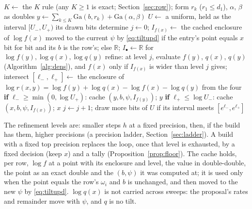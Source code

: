 \documentclass[11pt]{article}
\theoremstyle{definition}
\newcommand{\Ga}{\mathrm{Ga}}
\newcommand{\R}{\mathbb{R}}
\begin{document}
\begin{algorithm}[H]
\caption{\textsc{RowStep}$(x,b,\psi)$: one IMH step with a certified decision}\label{alg:row}
\begin{algorithmic}[1]
\State $K\gets$ the $K$ rule (any $K\ge1$ is exact; Section~\ref{sec:row}); form $r_k$ ($r_1\le d_1$), $\alpha$,
$\beta$ as doubles
\State $y\gets\sum_{k\le K}\Ga(b,r_k)+\Ga(\alpha,\beta)$ 
\State $U\gets$ a uniform, held as the interval $[U_-,U_+)$ its drawn bits determine
\State $j\gets0$; $I_{f(x)}\gets$ the cached enclosure of $\log f(x)$ moved to the current $\psi$ by
\eqref{eq:tiltupd} if the entry's point equals $x$ bit for bit and its $b$ is the row's; else $\R$; $I_\bullet\gets\R$ for $\log f(y),\log q(x),\log q(y)$
\Loop
  \State refine: at level $j$, evaluate $f(y)$, $q(x)$, $q(y)$ (Algorithm~\ref{alg:dens}), and $f(x)$ only if
  $I_{f(x)}$ is wider than level $j$ gives; intersect
  \State $[\ell_-,\ell_+]\gets$ the enclosure of $\log r(x,y)=\log f(y)+\log q(x)-\log f(x)-\log q(y)$ from the four
  \State \textbf{if} $\ell_-\ge\min(0,\log U_+)$: cache $(y,b,\psi,I_{f(y)})$; \Return $y$ 
  \State \textbf{if} $\ell_+\le\log U_-$: cache $(x,b,\psi,I_{f(x)})$; \Return $x$ 
  \State $j\gets j+1$; draw more bits of $U$ if its interval meets $[e^{\ell_-},e^{\ell_+}]$
\EndLoop
\end{algorithmic}
\end{algorithm}

The refinement levels are: smaller steps $h$ at a fixed precision, then, if the build has them, higher precisions
(a precision ladder, Section~\ref{sec:ladder}). A build with a fixed top precision replaces the loop, once that
level is exhausted, by a fixed decision (keep $x$) and a tally (Proposition~\ref{prop:floor}). The cache holds,
per row, $\log f$ at a point with its enclosure and level, the value in double-double, the point as an exact
double and the $(b,\psi)$ it was computed at; it is used only when the point equals the row's $\omega_i$ and $b$ is
unchanged, and then moved to the new $\psi$ by \eqref{eq:tiltupd}. $\log q(x)$ is not carried
across sweeps: the proposal's rates and remainder move with $\psi$, and $q$ is no tilt.
\end{document}

